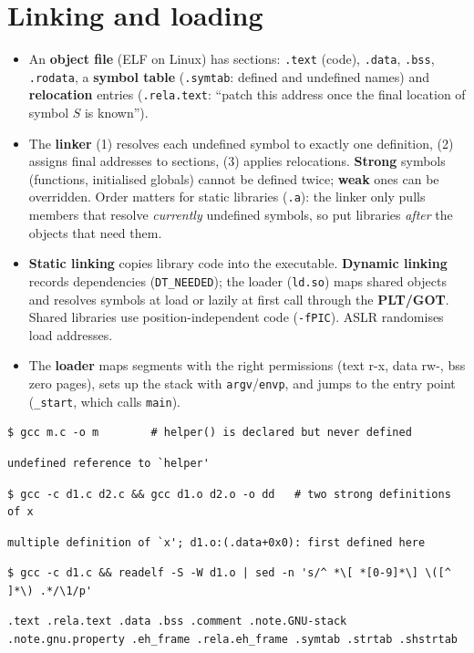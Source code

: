 \documentclass[10pt,a4paper,openany,oneside]{report}
\newcommand{\prio}[1]{\texorpdfstring{\ifcase#1\or{\color{gold}\ding{72}}\or{\color{gold}\ding{72}\ding{72}}\or{\color{gold}\ding{72}\ding{72}\ding{72}}\fi}{}}
\begin{document}
\section{Linking and loading \prio{2}}
\begin{mustbox}
\begin{itemize}[nosep]
\item An \textbf{object file} (ELF on Linux) has sections: \texttt{.text} (code), \texttt{.data}, \texttt{.bss}, \texttt{.rodata}, a \textbf{symbol table} (\texttt{.symtab}: defined and undefined names) and \textbf{relocation} entries (\texttt{.rela.text}: ``patch this address once the final location of symbol $S$ is known'').
\item The \textbf{linker} (1) resolves each undefined symbol to exactly one definition, (2) assigns final addresses to sections, (3) applies relocations. \textbf{Strong} symbols (functions, initialised globals) cannot be defined twice; \textbf{weak} ones can be overridden. Order matters for static libraries (\texttt{.a}): the linker only pulls members that resolve \emph{currently} undefined symbols, so put libraries \emph{after} the objects that need them.
\item \textbf{Static linking} copies library code into the executable. \textbf{Dynamic linking} records dependencies (\texttt{DT\_NEEDED}); the loader (\texttt{ld.so}) maps shared objects and resolves symbols at load or lazily at first call through the \textbf{PLT/GOT}. Shared libraries use position-independent code (\texttt{-fPIC}). ASLR randomises load addresses.
\item The \textbf{loader} maps segments with the right permissions (text r-x, data rw-, bss zero pages), sets up the stack with \texttt{argv}/\texttt{envp}, and jumps to the entry point (\texttt{\_start}, which calls \texttt{main}).
\end{itemize}
\end{mustbox}



\begin{lstlisting}[style=shcmd]
$ gcc m.c -o m        # helper() is declared but never defined
\end{lstlisting}
\begin{lstlisting}[style=out]
undefined reference to `helper'
\end{lstlisting}
\begin{lstlisting}[style=shcmd]
$ gcc -c d1.c d2.c && gcc d1.o d2.o -o dd   # two strong definitions of x
\end{lstlisting}
\begin{lstlisting}[style=out]
multiple definition of `x'; d1.o:(.data+0x0): first defined here
\end{lstlisting}
\begin{lstlisting}[style=shcmd]
$ gcc -c d1.c && readelf -S -W d1.o | sed -n 's/^ *\[ *[0-9]*\] \([^ ]*\) .*/\1/p'
\end{lstlisting}
\begin{lstlisting}[style=out]
 .text .rela.text .data .bss .comment .note.GNU-stack .note.gnu.property .eh_frame .rela.eh_frame .symtab .strtab .shstrtab 
\end{lstlisting}
\end{document}
